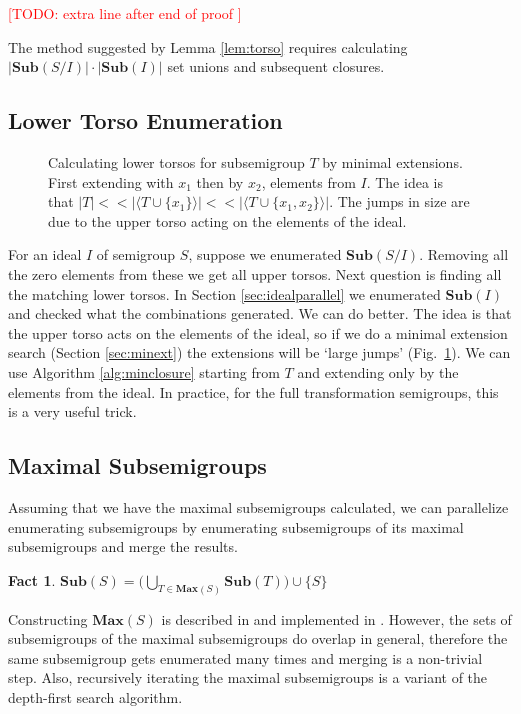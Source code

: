 \documentclass{amsart}
\newcommand{\Sub}{\mathbf{Sub}}
\newcommand{\Max}{\mathbf{Max}}
\newcommand{\todo}[1]{\textcolor{red}{ \small \textsf{[TODO:  #1 ]} \normalsize}}
\theoremstyle{plain}
\newtheorem{fact}[theorem]{Fact}
\theoremstyle{definition}
\begin{document}
\todo{extra line after end of proof}

The method suggested by Lemma \ref{lem:torso} requires calculating $|\Sub(S/I)|\cdot|\Sub(I)|$ set unions and subsequent closures. 
\subsection{Lower Torso Enumeration}
\label{sec:lowertorso}
\begin{figure}

\caption{Calculating lower torsos for subsemigroup $T$ by minimal extensions. First extending with $x_1$ then by $x_2$, elements from $I$. The idea is that $|T| << |\langle T\cup\{x_1\}\rangle| << |\langle T\cup\{x_1,x_2\}\rangle|$. The jumps in size are due to the upper torso acting on the elements of the ideal.}
\label{fig:lowertorsoenum}
\end{figure}
For an ideal $I$ of semigroup $S$, suppose we enumerated $\Sub(S/I)$.
Removing all the zero elements from these we get all upper torsos.
Next question is finding all the matching lower torsos.
In Section \ref{sec:idealparallel} we enumerated $\Sub(I)$ and checked what the combinations generated.
We can do better.
The idea is that the upper torso acts on the elements of the ideal, so if we do a minimal extension search (Section \ref{sec:minext}) the extensions will be `large jumps' (Fig.~\ref{fig:lowertorsoenum}).
We can use Algorithm \ref{alg:minclosure} starting from $T$ and extending only by the elements from the ideal. %
In practice, for the full transformation semigroups, this is a very useful trick.

\subsection{Maximal Subsemigroups}
Assuming that we have the maximal subsemigroups calculated, we can parallelize enumerating subsemigroups by enumerating subsemigroups of its maximal subsemigroups and merge the results.
\begin{fact}
$\Sub(S)=\big( \bigcup_{T\in \Max(S)}\Sub(T)\big)\cup \{S\}$
\end{fact}
\noindent Constructing $\Max(S)$ is described in \cite{MaxSubSemi} and implemented in \cite{Semigroups}.
However, the sets of subsemigroups of the maximal subsemigroups do overlap in general, therefore the same subsemigroup gets enumerated many times and merging is a non-trivial step.
Also, recursively iterating the maximal subsemigroups is a variant of the depth-first search algorithm.  
\end{document}
